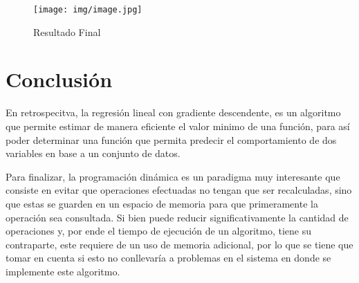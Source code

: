 \documentclass[12pt, a4paper]{article} %
\begin{document}
\begin{figure}[h]
	\centering
	\texttt{[image: img/image.jpg]}
	\caption{Resultado Final}
\end{figure}

\clearpage
\section{Conclusión}

En retrospecitva, la regresión lineal con gradiente descendente, es un algoritmo que permite estimar de manera eficiente el valor minimo de una función, para así poder determinar una función que permita predecir el comportamiento de dos variables en base a un conjunto de datos.

Para finalizar, la programación dinámica es un paradigma muy interesante que consiste en evitar que operaciones efectuadas no tengan que ser recalculadas, sino que estas se guarden en un espacio de memoria para que primeramente la operación sea consultada. Si bien puede reducir significativamente la cantidad de operaciones y, por ende el tiempo de ejecución de un algoritmo, tiene su contraparte, este requiere de un uso de memoria adicional, por lo que se tiene que tomar en cuenta si esto no conllevaría a problemas en el sistema en donde se implemente este algoritmo.


\nocite{*} %

\clearpage


\end{document}
